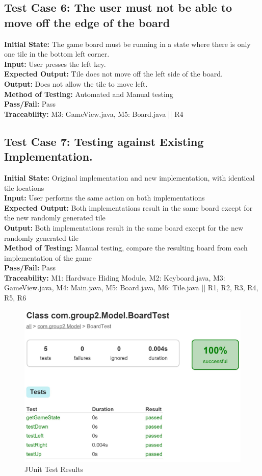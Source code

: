 \documentclass[12pt]{article}
\begin{document}
\subsection{Test Case 6: The user must not be able to move off the edge of the board}

\textbf{Initial State:} The game board must be running in a state where there is only one tile in the bottom left corner.\\
\textbf{Input:} User presses the left key.\\
\textbf{Expected Output:} Tile does not move off the left side of the board.\\
\textbf{Output:} Does not allow the tile to move left.\\
\textbf{Method of Testing:} Automated and Manual testing\\
\textbf{Pass/Fail:} Pass\\
\textbf{Traceability:} M3: GameView.java, M5: Board.java || R4

\subsection{Test Case 7: Testing against Existing Implementation.}
\textbf{Initial State:} Original implementation and new implementation, with identical tile locations\\
\textbf{Input:} User performs the same action on both implementations\\
\textbf{Expected Output:} Both implementations result in the same board except for the new randomly generated tile\\
\textbf{Output:} Both implementations result in the same board except for the new randomly generated tile\\
\textbf{Method of Testing:} Manual testing, compare the resulting board from each implementation of the game\\
\textbf{Pass/Fail:} Pass\\
\textbf{Traceability:} M1: Hardware Hiding Module, M2: Keyboard.java, M3: GameView.java, M4: Main.java, M5: Board.java, M6: Tile.java || R1, R2, R3, R4, R5, R6


\begin{figure}[H]
	\centering
	\includegraphics[width = 14cm]{JUnit_Test_Results}
	\caption{JUnit Test Results}
	\label{JUnit Test Results}
\end{figure}
\end{document}
